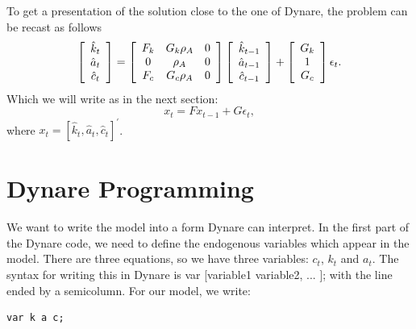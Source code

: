 \documentclass[a4paper,12pt]{article}%
\begin{document}
To get a presentation of the solution close to the one of Dynare, the problem
can be recast as follows%
\begin{equation}
\left[
\begin{array}
[c]{c}%
\hat{k}_{t}\\
\hat{a}_{t}\\
\hat{c}_{t}%
\end{array}
\right]  =\left[
\begin{array}
[c]{ccc}%
F_{k} & G_{k}\rho_{A} & 0\\
0 & \rho_{A} & 0\\
F_{c} & G_{c}\rho_{A} & 0
\end{array}
\right]  \left[
\begin{array}
[c]{c}%
\hat{k}_{t-1}\\
\hat{a}_{t-1}\\
\hat{c}_{t-1}%
\end{array}
\right]  +\left[
\begin{array}
[c]{c}%
G_{k}\\
1\\
G_{c}%
\end{array}
\right]  \epsilon_{t}. \label{eq PQ full}%
\end{equation}
Which we will write as in the next section:%
\begin{equation}
x_{t}=Fx_{t-1}+G\epsilon_{t}, \label{eq PQ compact}%
\end{equation}
where $x_{t}=[\hat{k}_{t},\hat{a}_{t},\hat{c}_{t}]^{\prime}$.%

%


\newpage

\section{Dynare Programming}

We want to write the model into a form Dynare can interpret. In the first part
of the Dynare code, we need to define the endogenous variables which appear in
the model. There are three equations, so we have three variables: $c_{t}$,
$k_{t}$ and $a_{t}$. The syntax for writing this in Dynare is \textsf{var
[variable1 variable2, ... ]}; with the line ended by a semicolumn. For our
model, we write:%

\vspace{1ex}
\begin{verbatim}
var k a c;
\end{verbatim}
\vspace{1ex}%
\end{document}
